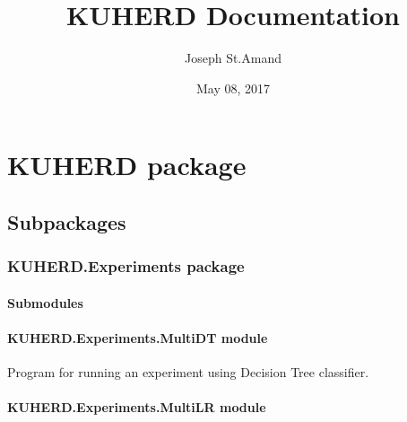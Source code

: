 \documentclass[letterpaper,10pt,english]{sphinxmanual}
\title{KUHERD Documentation}
\date{May 08, 2017}
\author{Joseph St.Amand}
\begin{document}
\maketitle
\sphinxtableofcontents
{}\label{\detokenize{index::doc}}



\chapter{KUHERD package}
\label{\detokenize{KUHERD:welcome-to-kuherd-s-documentation}}\label{\detokenize{KUHERD::doc}}\label{\detokenize{KUHERD:kuherd-package}}

\section{Subpackages}
\label{\detokenize{KUHERD:subpackages}}

\subsection{KUHERD.Experiments package}
\label{\detokenize{KUHERD.Experiments:kuherd-experiments-package}}\label{\detokenize{KUHERD.Experiments::doc}}

\subsubsection{Submodules}
\label{\detokenize{KUHERD.Experiments:submodules}}

\subsubsection{KUHERD.Experiments.MultiDT module}
\label{\detokenize{KUHERD.Experiments:kuherd-experiments-multidt-module}}\label{\detokenize{KUHERD.Experiments:module-KUHERD.Experiments.MultiDT}}

\begin{fulllineitems}
\label{\detokenize{KUHERD.Experiments:KUHERD.Experiments.MultiDT.MultiDT}}
Program for running an experiment using Decision Tree classifier.

\end{fulllineitems}



\subsubsection{KUHERD.Experiments.MultiLR module}
\label{\detokenize{KUHERD.Experiments:module-KUHERD.Experiments.MultiLR}}\label{\detokenize{KUHERD.Experiments:kuherd-experiments-multilr-module}}
\end{document}
